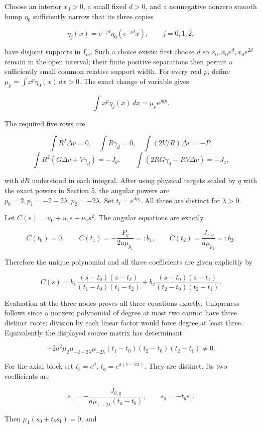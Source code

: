 \documentclass[10pt,a4paper]{article}
\begin{document}
Choose an interior \(x_0>0\), a small fixed \(d>0\), and a nonnegative nonzero smooth bump \(\eta_0\) sufficiently narrow that its three copies

\[
\eta_j(x)=e^{-jd}\eta_0(e^{-jd}x),\qquad j=0,1,2,
\]

have disjoint supports in \(I_m\). Such a choice exists: first choose \(d\) so \(x_0,x_0e^d,x_0e^{2d}\) remain in the open interval; their finite positive separations then permit a sufficiently small common relative support width. For every real \(p\), define \(\mu_p=\int x^p\eta_0(x)\,dx>0\). The exact change of variable gives

\[
\int x^p\eta_j(x)\,dx=\mu_pe^{jdp}.
\tag{MC23}
\]

The required five rows are

\[
\int R^2\Delta v=0,\quad\int R\gamma_d=0,\quad
\int(2V/R)\Delta v=-P,
\]
\[
\int R^2(G\Delta v+V\gamma_d)=-J_\theta,
\qquad
\int(2RG\gamma_d-RV\Delta v)=-J_z,
\tag{MC24}
\]

with \(dR\) understood in each integral. After using physical targets scaled by \(q\) with the exact powers in Section 5, the angular powers are \(p_0=2,p_1=-2-2\lambda,p_2=-2\lambda\). Set \(t_i=e^{dp_i}\). All three are distinct for \(\lambda>0\).

Let \(C(s)=u_0+u_1s+u_2s^2\). The angular equations are exactly

\[
C(t_0)=0,\qquad
C(t_1)=-\frac{P_q}{2a\mu_{p_1}}=:b_1,
\qquad
C(t_2)=\frac{J_{z,q}}{a\mu_{p_2}}=:b_2.
\]

Therefore the unique polynomial and all three coefficients are given explicitly by

\[
C(s)=b_1\frac{(s-t_0)(s-t_2)}{(t_1-t_0)(t_1-t_2)}
+b_2\frac{(s-t_0)(s-t_1)}{(t_2-t_0)(t_2-t_1)}.
\tag{MC25}
\]

Evaluation at the three nodes proves all three equations exactly. Uniqueness follows since a nonzero polynomial of degree at most two cannot have three distinct roots: division by each linear factor would force degree at least three. Equivalently the displayed source matrix has determinant

\[
-2a^2\mu_2\mu_{-2-2\lambda}\mu_{-2\lambda}
(t_1-t_0)(t_2-t_0)(t_2-t_1)\ne0.
\]

For the axial block set \(t_b=e^d\), \(t_a=e^{d(1-2\lambda)}\). They are distinct. Its two coefficients are

\[
s_1=-\frac{J_{\theta,q}}{a\mu_{1-2\lambda}(t_a-t_b)},
\qquad s_0=-t_bs_1.
\tag{MC26}
\]

Then \(\mu_1(s_0+t_bs_1)=0\), and
\end{document}
